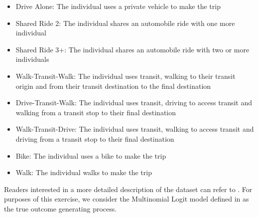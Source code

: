 \begin{itemize}
   \item Drive Alone: The individual uses a private vehicle to make the trip
   \item Shared Ride 2: The individual shares an automobile ride with one more individual
   \item Shared Ride 3+: The individual shares an automobile ride with two or more individuals
   \item Walk-Transit-Walk: The individual uses transit, walking to their transit origin and from their transit destination to the final destination
   \item Drive-Transit-Walk: The individual uses transit, driving to access transit and walking from a transit stop to their final destination
   \item Walk-Transit-Drive: The individual uses transit, walking to access transit and driving from a transit stop to their final destination
   \item Bike: The individual uses a bike to make the trip
   \item Walk: The individual walks to make the trip
\end{itemize}

Readers interested in a more detailed description of the dataset can refer to \citet{brathwaite_asymmetric}.
For purposes of this exercise, we consider the Multinomial Logit model defined in \citet{brathwaite_asymmetric} as the true outcome generating process.

